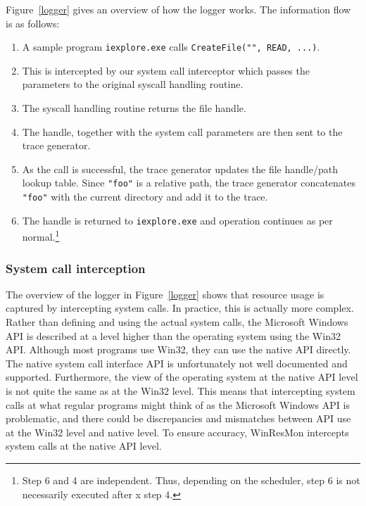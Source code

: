 Figure~\ref{logger} gives an overview of how the logger works.
The information flow is as follows:

\begin{enumerate}
\item A sample program {\small\tt iexplore.exe} calls
{\small\tt CreateFile("", READ, ...)}.
\item This is intercepted by our system call interceptor
which passes the parameters to the original syscall handling routine.
\item The syscall handling routine returns the file handle.
\item The handle, together with the system call parameters are then sent to
the trace generator.
\item As the call is successful, the trace generator updates 
the file handle/path lookup table.
Since {\small\tt "foo"} is a relative path, the trace generator concatenates
{\small\tt "foo"} with the current directory and add it to the trace.
\item The handle is returned to {\small\tt iexplore.exe} and operation
continues as per normal.\footnote{Step 6 and 4 are independent.
Thus, depending on the scheduler, step 6 is not necessarily executed after
x
step 4.} 
\end{enumerate}


\subsubsection{System call interception}

The overview of the logger in Figure~\ref{logger} shows that resource usage is
captured by intercepting system calls.  In practice, this is actually more
complex.  Rather than defining and using the actual system calls, the
Microsoft Windows API is described at a level higher than the operating system
using the Win32 API.  Although most programs use Win32, they can use the
native API \cite{nebbett2000windows} directly.  The native system call interface API
is unfortunately not well documented and supported.  Furthermore, the view of
the operating system at the native API level is not quite the same as at the
Win32 level.  This means that intercepting system calls at what regular
programs might think of as the Microsoft Windows API is problematic, and there
could be discrepancies and mismatches between API use at the Win32 level and
native level.  To ensure accuracy, WinResMon intercepts system calls at the
native API level.

